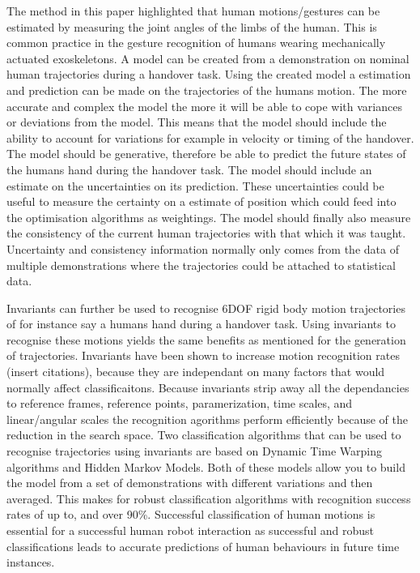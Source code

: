 \documentclass{article}
\begin{document}
The method in this paper highlighted that human motions/gestures can be estimated by measuring the joint angles of the limbs of the human. 
This is common practice in the gesture recognition of humans wearing mechanically actuated exoskeletons.
A model can be created from a demonstration on nominal human trajectories during a handover task. 
Using the created model a estimation and prediction can be made on the trajectories of the humans motion. 
The more accurate and complex the model the more it will be able to cope with variances or deviations from the model. 
This means that the model should include the ability to account for variations for example in velocity or timing of the handover. 
The model should be generative, therefore be able to predict the future states of the humans hand during the handover task. 
The model should include an estimate on the uncertainties on its prediction. These uncertainties could be useful to measure the certainty on a estimate of position which could feed into the optimisation algorithms as weightings.
The model should finally also measure the consistency of the current human trajectories with that which it was taught. 
Uncertainty and consistency information normally only comes from the data of multiple demonstrations where the trajectories could be attached to statistical data. 

Invariants can further be used to recognise 6DOF rigid body motion trajectories of for instance say a humans hand during a handover task. 
Using invariants to recognise these motions yields the same benefits as mentioned for the generation of trajectories. 
Invariants have been shown to increase motion recognition rates (insert citations), because they are independant on many factors that would normally affect classificaitons. 
Because invariants strip away all the dependancies to reference frames, reference points, paramerization, time scales, and linear/angular scales the recognition agorithms perform efficiently because of the reduction in the search space. 
Two classification algorithms that can be used to recognise trajectories using invariants are based on Dynamic Time Warping algorithms and Hidden Markov Models. 
Both of these models allow you to build the model from a set of demonstrations with different variations and then averaged. 
This makes for robust classification algorithms with recognition success rates of up to, and over 90\%. 
Successful classification of human motions is essential for a successful human robot interaction as successful and robust classifications leads to accurate predictions of human behaviours in future time instances. 
\end{document}
